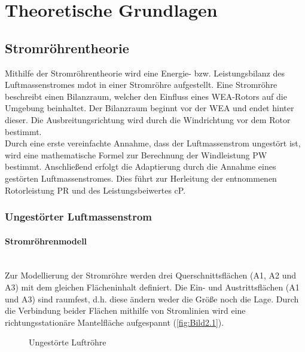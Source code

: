 \section{Theoretische Grundlagen} \label{theo_grundl}

\subsection{Stromröhrentheorie}
Mithilfe der Stromröhrentheorie wird eine Energie- bzw. Leistungsbilanz des Luftmassenstromes \acs{mdot} in einer Stromröhre aufgestellt. Eine Stromröhre beschreibt einen Bilanzraum, welcher den Einfluss eines WEA-Rotors auf die Umgebung beinhaltet. Der Bilanzraum beginnt vor der WEA und endet hinter dieser. Die Ausbreitungsrichtung wird durch die Windrichtung vor dem Rotor bestimmt. \\
Durch eine erste vereinfachte Annahme, dass der Luftmassenstrom ungestört ist, wird eine mathematische Formel zur Berechnung der Windleistung \acs{PW} bestimmt. Anschließend erfolgt die Adaptierung durch die Annahme eines gestörten Luftmassenstromes. Dies führt zur Herleitung der entnommenen Rotorleistung \acs{PR} und des Leistungsbeiwertes \acs{cP}.

\subsubsection{Ungestörter Luftmassenstrom}

\paragraph{Stromröhrenmodell}\mbox{}\smallskip\\
Zur Modellierung der Stromröhre werden drei Querschnittsflächen (\acs{A1}, \acs{A2} und \acs{A3}) mit dem gleichen Flächeninhalt definiert. Die Ein- und Austrittsflächen (\acs{A1} und \acs{A3}) sind raumfest, d.h. diese ändern weder die Größe noch die Lage. Durch die Verbindung beider Flächen mithilfe von Stromlinien wird eine richtungsstationäre Mantelfläche aufgespannt (\autoref{fig:Bild2.1}).\\
\begin{figure}[H]
   \centering
   \caption[Ungestörte Luftröhre]{Ungestörte Luftröhre \cite{SkriptSchulte}}
   \label{fig:Bild2.1}
\end{figure}

